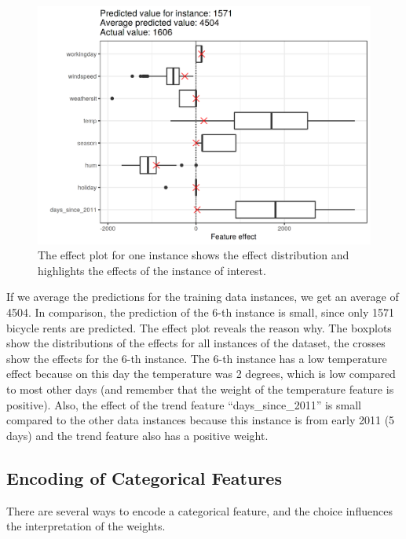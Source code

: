 \documentclass[12pt,]{krantz}
\begin{document}
\begin{figure}

{\centering \includegraphics[width=\textwidth]{images/linear-effects-single-1} 

}

\caption{The effect plot for one instance shows the effect distribution and highlights the effects of the instance of interest.}\label{fig:linear-effects-single}
\end{figure}

If we average the predictions for the training data instances, we get an
average of 4504. In comparison, the prediction of the 6-th instance is
small, since only 1571 bicycle rents are predicted. The effect plot
reveals the reason why. The boxplots show the distributions of the
effects for all instances of the dataset, the crosses show the effects
for the 6-th instance. The 6-th instance has a low temperature effect
because on this day the temperature was 2 degrees, which is low compared
to most other days (and remember that the weight of the temperature
feature is positive). Also, the effect of the trend feature
``days\_since\_2011'' is small compared to the other data instances
because this instance is from early 2011 (5 days) and the trend feature
also has a positive weight.

\hypertarget{cat-code}{\subsection{Encoding of Categorical
Features}\label{cat-code}}

There are several ways to encode a categorical feature, and the choice
influences the interpretation of the weights.
\end{document}
